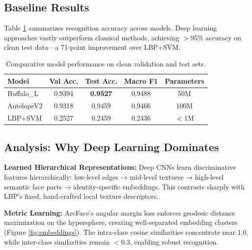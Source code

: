 \documentclass[11pt,a4paper]{article}
\begin{document}
\subsection{Baseline Results}

Table \ref{tab:performance} summarizes recognition accuracy across models. Deep learning approaches vastly outperform classical methods, achieving $>$95\% accuracy on clean test data—a 71-point improvement over LBP+SVM.

\begin{table}[H]
\centering
\caption{Comparative model performance on clean validation and test sets.}
\label{tab:performance}
\begin{tabular}{@{}lcccc@{}}
\toprule
\textbf{Model} & \textbf{Val Acc.} & \textbf{Test Acc.} & \textbf{Macro F1} & \textbf{Parameters} \\ \midrule
Buffalo\_L & 0.9394 & \textbf{0.9527} & 0.9488 & 50M \\
AntelopeV2 & 0.9318 & 0.9459 & 0.9466 & 100M \\
LBP+SVM & 0.2527 & 0.2459 & 0.2436 & $<$1M \\ \bottomrule
\end{tabular}
\end{table}

\subsection{Analysis: Why Deep Learning Dominates}

\textbf{Learned Hierarchical Representations:} Deep CNNs learn discriminative features hierarchically: low-level edges → mid-level textures → high-level semantic face parts → identity-specific embeddings. This contrasts sharply with LBP's fixed, hand-crafted local texture descriptors.

\textbf{Metric Learning:} ArcFace's angular margin loss enforces geodesic distance maximization on the hypersphere, creating well-separated embedding clusters (Figure \ref{fig:embeddings}). The intra-class cosine similarities concentrate near 1.0, while inter-class similarities remain $<$0.3, enabling robust recognition.
\end{document}
